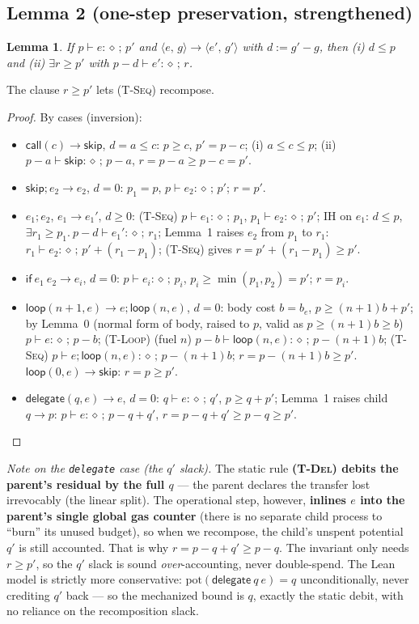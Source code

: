 \documentclass[11pt]{article}
\theoremstyle{plain}
\newtheorem*{lemmaU}{Lemma}
\newcommand{\kw}[1]{\mathsf{#1}}                      %
\newcommand{\J}[3]{#1 \vdash #2 : \diamond\,;\,#3}    %
\newcommand{\cfg}[2]{\langle #1,\, #2\rangle}          %
\newcommand{\pot}{\mathrm{pot}}
\newcommand{\rul}[1]{\textsc{(#1)}}
\begin{document}
\subsection{Lemma 2 (one-step preservation, strengthened)}

\begin{lemmaU}
If $\J{p}{e}{p'}$ and $\cfg{e}{g} \to \cfg{e'}{g'}$ with $d := g' - g$, then (i) $d \le p$ and (ii)
$\exists r \ge p'$ with $\J{p - d}{e'}{r}$.
\end{lemmaU}

The clause $r \ge p'$ lets \rul{T-Seq} recompose.

\begin{proof}
By cases (inversion):
\begin{itemize}
\item $\kw{call}(c) \to \kw{skip}$, $d = a \le c$: $p \ge c$, $p' = p - c$; (i) $a \le c \le p$;
  (ii) $\J{p - a}{\kw{skip}}{p - a}$, $r = p - a \ge p - c = p'$.
\item $\kw{skip} ; e_2 \to e_2$, $d = 0$: $p_1 = p$, $\J{p}{e_2}{p'}$; $r = p'$.
\item $e_1 ; e_2$, $e_1 \to e_1'$, $d \ge 0$: \rul{T-Seq} $\J{p}{e_1}{p_1}$, $\J{p_1}{e_2}{p'}$; IH
  on $e_1$: $d \le p$, $\exists r_1 \ge p_1.\ \J{p - d}{e_1'}{r_1}$; Lemma~1 raises $e_2$ from
  $p_1$ to $r_1$: $\J{r_1}{e_2}{p' + (r_1 - p_1)}$; \rul{T-Seq} gives $r = p' + (r_1 - p_1) \ge p'$.
\item $\kw{if}\ e_1\ e_2 \to e_i$, $d = 0$: $\J{p}{e_i}{p_i}$, $p_i \ge \min(p_1, p_2) = p'$;
  $r = p_i$.
\item $\kw{loop}(n+1, e) \to e ; \kw{loop}(n, e)$, $d = 0$: body cost $b = b_e$,
  $p \ge (n+1) b + p'$; by Lemma~0 (normal form of body, raised to $p$, valid as
  $p \ge (n+1) b \ge b$) $\J{p}{e}{p - b}$; \rul{T-Loop} (fuel $n$)
  $\J{p - b}{\kw{loop}(n, e)}{p - (n+1) b}$; \rul{T-Seq} $\J{p}{e ; \kw{loop}(n, e)}{p - (n+1) b}$;
  $r = p - (n+1) b \ge p'$. $\kw{loop}(0, e) \to \kw{skip}$: $r = p \ge p'$.
\item $\kw{delegate}(q, e) \to e$, $d = 0$: $\J{q}{e}{q'}$, $p \ge q + p'$; Lemma~1 raises child
  $q \to p$: $\J{p}{e}{p - q + q'}$, $r = p - q + q' \ge p - q \ge p'$. \qedhere
\end{itemize}
\end{proof}

\emph{Note on the \texttt{delegate} case (the $q'$ slack).} The static rule \textbf{\rul{T-Del}
debits the parent's residual by the full $q$} --- the parent declares the transfer lost irrevocably
(the linear split). The operational step, however, \textbf{inlines $e$ into the parent's single
global gas counter} (there is no separate child process to ``burn'' its unused budget), so when we
recompose, the child's unspent potential $q'$ is still accounted. That is why
$r = p - q + q' \ge p - q$. The invariant only needs $r \ge p'$, so the $q'$ slack is sound
\emph{over}-accounting, never double-spend. The Lean model is strictly more conservative:
$\pot(\kw{delegate}\ q\ e) = q$ unconditionally, never crediting $q'$ back --- so the mechanized
bound is $q$, exactly the static debit, with no reliance on the recomposition slack.
\end{document}
